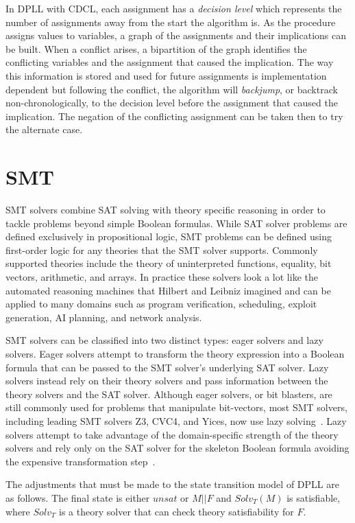 \documentclass[]{final_report}
\begin{document}
In DPLL with CDCL, each assignment has a \textit{decision level} which represents the number of assignments away from the start the algorithm is. As the procedure assigns values to variables, a graph of the assignments and their implications can be built. When a conflict arises, a bipartition of the graph identifies the conflicting variables and the assignment that caused the implication. The way this information is stored and used for future assignments is implementation dependent but following the conflict, the algorithm will \textit{backjump}, or backtrack non-chronologically, to the decision level before the assignment that caused the implication. The negation of the conflicting assignment can be taken then to try the alternate case.

\section{SMT}

SMT solvers combine SAT solving with theory specific reasoning in order to tackle problems beyond simple Boolean formulas. While SAT solver problems are defined exclusively in propositional logic, SMT problems can be defined using first-order logic for any theories that the SMT solver supports. Commonly supported theories include the theory of uninterpreted functions, equality, bit vectors, arithmetic, and arrays. In practice these solvers look a lot like the automated reasoning machines that Hilbert and Leibniz imagined and can be applied to many domains such as program verification, scheduling, exploit generation, AI planning, and network analysis.

SMT solvers can be classified into two distinct types: eager solvers and lazy solvers. Eager solvers attempt to transform the theory expression into a Boolean formula that can be passed to the SMT solver's underlying SAT solver. Lazy solvers instead rely on their theory solvers and pass information between the theory solvers and the SAT solver. Although eager solvers, or bit blasters, are still commonly used for problems that manipulate bit-vectors, most SMT solvers, including leading SMT solvers Z3, CVC4, and Yices, now use lazy solving~\cite{Tinelli2012,smt-comp-results}. Lazy solvers attempt to take advantage of the domain-specific strength of the theory solvers and rely only on the SAT solver for the skeleton Boolean formula avoiding the expensive transformation step~\cite{sattosmt, smtdpplt}.

The adjustments that must be made to the state transition model of DPLL are as follows. The final state is either $unsat$ or $M || F$ and $Solv _T(M)$ is satisfiable, where $Solv_T$ is a theory solver that can check theory satisfiability for $F$.
\end{document}
